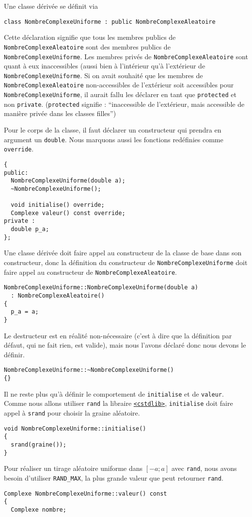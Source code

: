 \documentclass{book}
\newcommand{\inline}[1]{\texttt{#1}}
\begin{document}
\begin{correction}
Une classe dérivée se définit via
\begin{verbatim}
class NombreComplexeUniforme : public NombreComplexeAleatoire
\end{verbatim}
Cette déclaration signifie que tous les membres publics de \inline{NombreComplexeAleatoire} sont des membres publics de \inline{NombreComplexeUniforme}. Les membres privés de \inline{NombreComplexeAleatoire} sont quant à eux inaccessibles (aussi bien à l'intérieur qu'à l'extérieur de \inline{NombreComplexeUniforme}. Si on avait souhaité que les membres de \inline{NombreComplexeAleatoire} non-accessibles de l'extérieur soit accessibles pour \inline{NombreComplexeUniforme}, il aurait fallu les déclarer en tant que \inline{protected} et non \inline{private}. (\inline{protected} signifie : ``inaccessible de l'extérieur, mais accessible de manière privée dans les classes filles'')

Pour le corps de la classe, il faut déclarer un constructeur qui prendra en argument un \inline{double}. Nous marquons aussi les fonctions redéfinies comme \inline{override}.
\begin{verbatim}
{
public:
  NombreComplexeUniforme(double a);
  ~NombreComplexeUniforme();
  
  void initialise() override;
  Complexe valeur() const override;
private :
  double p_a;
};
\end{verbatim}
Une classe dérivée doit faire appel au constructeur de la classe de base dans son constructeur, donc la définition du constructeur de \inline{NombreComplexeUniforme} doit faire appel au constructeur de \inline{NombreComplexeAleatoire}.
\begin{verbatim}
NombreComplexeUniforme::NombreComplexeUniforme(double a)
  : NombreComplexeAleatoire()
{
  p_a = a;
}
\end{verbatim}
Le destructeur est en réalité non-nécessaire (c'est à dire que la définition par défaut, qui ne fait rien, est valide), mais nous l'avons déclaré donc nous devons le définir.
\begin{verbatim}
NombreComplexeUniforme::~NombreComplexeUniforme()
{}
\end{verbatim}

Il ne reste plus qu'à définir le comportement de \inline{initialise} et de \inline{valeur}. Comme nous allons utiliser \inline{rand} la libraire \href{http://en.cppreference.com/w/cpp/numeric/random/rand}{\inline{<cstdlib>}}, \inline{initialise} doit faire appel à \inline{srand} pour choisir la graine aléatoire.
\begin{verbatim}
void NombreComplexeUniforme::initialise()
{
  srand(graine());
}
\end{verbatim}
Pour réaliser un tirage aléatoire uniforme dans $[-a;a]$ avec \inline{rand}, nous avons besoin d'utiliser \inline{RAND_MAX}, la plus grande valeur que peut retourner \inline{rand}.
\begin{verbatim}
Complexe NombreComplexeUniforme::valeur() const
{
  Complexe nombre;
  

\end{verbatim}
\end{correction}
\end{document}
